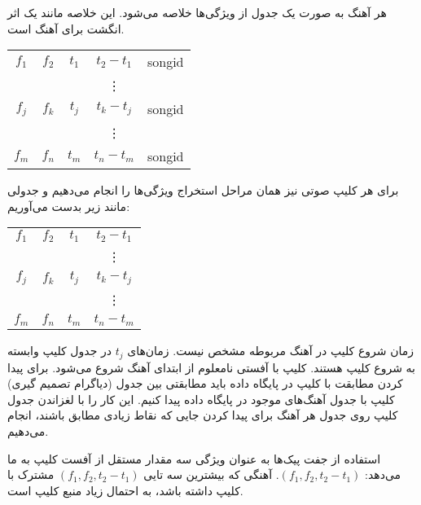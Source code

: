 \documentclass{utsignal}
\begin{document}
	هر آهنگ به صورت یک جدول از ویژگی‌ها خلاصه می‌شود. این خلاصه مانند یک اثر انگشت برای آهنگ است.
	\begin{center}
		\begin{latin}
			\begin{tabular}{|c|c|c|c|c|}
				$f_1$ & $f_2$ & $t_1$ & $t_2-t_1$ & songid\\
				&&&\vdots&\\
				$f_j$ & $f_k$ & $t_j$ & $t_k-t_j$ & songid\\
				&&&\vdots&\\
				$f_m$ & $f_n$ & $t_m$ & $t_n-t_m$ & songid\\
			\end{tabular}
		\end{latin}
	\end{center}
	برای هر کلیپ صوتی نیز همان مراحل استخراج ویژگی‌ها را انجام می‌دهیم و جدولی مانند زیر بدست می‌آوریم:
	\begin{center}
		\begin{latin}
			\begin{tabular}{|c|c|c|c|}
				$f_1$ & $f_2$ & $t_1$ & $t_2-t_1$\\
				&&&\vdots\\
				$f_j$ & $f_k$ & $t_j$ & $t_k-t_j$\\
				&&&\vdots\\
				$f_m$ & $f_n$ & $t_m$ & $t_n-t_m$\\
			\end{tabular}
		\end{latin}
	\end{center}
	
	زمان شروع کلیپ در آهنگ مربوطه مشخص نیست. زمان‌های $t_j$ در جدول کلیپ وابسته به شروع کلیپ هستند. کلیپ با آفستی نامعلوم از ابتدای آهنگ شروع می‌شود. برای پیدا کردن مطابقت با کلیپ در پایگاه داده باید مطابقتی بین جدول (دیاگرام تصمیم گیری) کلیپ با جدول آهنگ‌های موجود در پایگاه داده پیدا کنیم. این کار را با لغزاندن جدول کلیپ روی جدول هر آهنگ برای پیدا کردن جایی که نقاط زیادی مطابق باشند، انجام می‌دهیم.
	
	استفاده از جفت پیک‌ها به عنوان ویژگی سه مقدار مستقل از آفست کلیپ به ما می‌دهد: $(f_1, f_2, t_2-t_1)$. آهنگی که بیشترین سه تایی $(f_1, f_2, t_2 - t_1)$ مشترک با کلیپ داشته باشد، به احتمال زیاد منبع کلیپ است.
\end{document}

